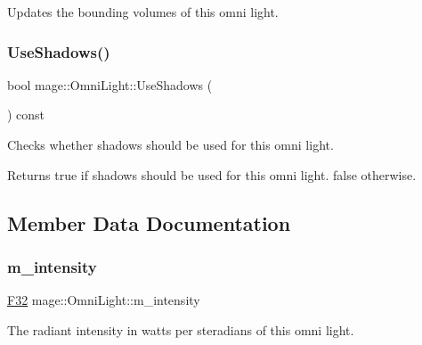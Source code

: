 Updates the bounding volumes of this omni light. \hypertarget{classmage_1_1_omni_light_a8d58e7e1b26e54b3d9785ca79213cc4f}{}\label{classmage_1_1_omni_light_a8d58e7e1b26e54b3d9785ca79213cc4f} 
\subsubsection{\texorpdfstring{Use\+Shadows()}{UseShadows()}}
{\footnotesize\ttfamily bool mage\+::\+Omni\+Light\+::\+Use\+Shadows (\begin{DoxyParamCaption}{ }\end{DoxyParamCaption}) const\hspace{0.3cm}{\ttfamily [noexcept]}}

Checks whether shadows should be used for this omni light.

\begin{DoxyReturn}{Returns}
{\ttfamily true} if shadows should be used for this omni light. {\ttfamily false} otherwise. 
\end{DoxyReturn}


\subsection{Member Data Documentation}
\hypertarget{classmage_1_1_omni_light_aa0cbdebabf3ce0d8bbaeff7cf88cadd0}{}\label{classmage_1_1_omni_light_aa0cbdebabf3ce0d8bbaeff7cf88cadd0} 
\subsubsection{\texorpdfstring{m\+\_\+intensity}{m\_intensity}}
{\footnotesize\ttfamily \hyperlink{namespacemage_aa97e833b45f06d60a0a9c4fc22ae02c0}{F32} mage\+::\+Omni\+Light\+::m\+\_\+intensity\hspace{0.3cm}{\ttfamily [private]}}

The radiant intensity in watts per steradians of this omni light. \hypertarget{classmage_1_1_omni_light_a0427a9c7f90750c645cd67ef0bafce47}{}\label{classmage_1_1_omni_light_a0427a9c7f90750c645cd67ef0bafce47} 
